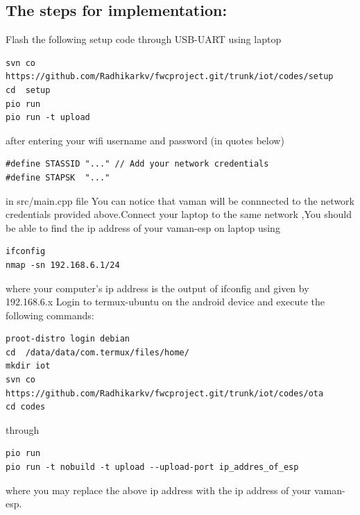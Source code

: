 \documentclass[10pt, a4paper]{article}
\begin{document}
 \subsection{The steps for implementation:}
  Flash the following setup code through USB-UART using laptop
\begin{lstlisting}
svn co https://github.com/Radhikarkv/fwcproject.git/trunk/iot/codes/setup
cd  setup
pio run
pio run -t upload
\end{lstlisting}
after entering your wifi username and password (in quotes below)
\begin{lstlisting}
#define STASSID "..." // Add your network credentials
#define STAPSK  "..."
\end{lstlisting}
in src/main.cpp file
 You can notice that vaman will be connnected to the network credentials provided above.Connect your laptop to the same network ,You should be able to find the ip address of your vaman-esp on laptop using 
\begin{lstlisting}
ifconfig
nmap -sn 192.168.6.1/24
\end{lstlisting}
where your computer's ip address is the output of ifconfig and given by 192.168.6.x
Login to termux-ubuntu on the android device and execute the following commands:
\begin{lstlisting}
proot-distro login debian
cd  /data/data/com.termux/files/home/
mkdir iot
svn co https://github.com/Radhikarkv/fwcproject.git/trunk/iot/codes/ota
cd codes
\end{lstlisting}
\begin{center}
\end{center}
through 
\begin{lstlisting}
pio run 
pio run -t nobuild -t upload --upload-port ip_addres_of_esp
\end{lstlisting}
where you may replace the above ip address with the ip address of your vaman-esp.
\end{document}
